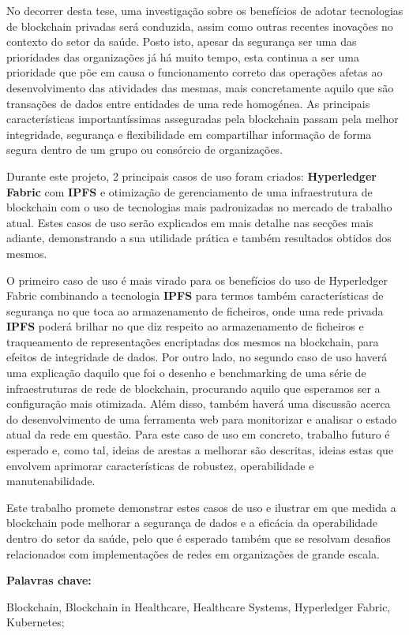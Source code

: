 No decorrer desta tese, uma investigação sobre os benefícios de adotar tecnologias de blockchain privadas será conduzida, assim como outras recentes inovações no contexto do setor da saúde. Posto isto, apesar da segurança ser uma das prioridades das organizações já há muito tempo, esta continua a ser uma prioridade que põe em causa o funcionamento correto das operações afetas ao desenvolvimento das atividades das mesmas, mais concretamente aquilo que são transações de dados entre entidades de uma rede homogénea. As principais características importantíssimas asseguradas pela blockchain passam pela melhor integridade, segurança e flexibilidade em compartilhar informação de forma segura dentro de um grupo ou consórcio de organizações.

Durante este projeto, 2 principais casos de uso foram criados: \textbf{Hyperledger Fabric} com \textbf{IPFS} e otimização de gerenciamento de uma infraestrutura de blockchain com o uso de tecnologias mais padronizadas no mercado de trabalho atual. Estes casos de uso serão explicados em mais detalhe nas secções mais adiante, demonstrando a sua utilidade prática e também resultados obtidos dos mesmos.

O primeiro caso de uso é mais virado para os benefícios do uso de Hyperledger Fabric combinando a tecnologia \textbf{IPFS} para termos também características de segurança no que toca ao armazenamento de ficheiros, onde uma rede privada \textbf{IPFS} poderá brilhar no que diz respeito ao armazenamento de ficheiros e traqueamento de representações encriptadas dos mesmos na blockchain, para efeitos de integridade de dados. Por outro lado, no segundo caso de uso haverá uma explicação daquilo que foi o desenho e benchmarking de uma série de infraestruturas de rede de blockchain, procurando aquilo que esperamos ser a configuração mais otimizada. Além disso, também haverá uma discussão acerca do desenvolvimento de uma ferramenta web para monitorizar e analisar o estado atual da rede em questão. Para este caso de uso em concreto, trabalho futuro é esperado e, como tal, ideias de arestas a melhorar são descritas, ideias estas que envolvem aprimorar características de robustez, operabilidade e manutenabilidade.

Este trabalho promete demonstrar estes casos de uso e ilustrar em que medida a blockchain pode melhorar a segurança de dados e a eficácia da operabilidade dentro do setor da saúde, pelo que é esperado também que se resolvam desafios relacionados com implementações de redes em organizações de grande escala.

\vspace{1cm} %
\textbf{Palavras chave:} \parbox[t]{0.6\textwidth}{\raggedright Blockchain, Blockchain in Healthcare, Healthcare Systems, Hyperledger Fabric, Kubernetes;}
\medskip

\pagebreak